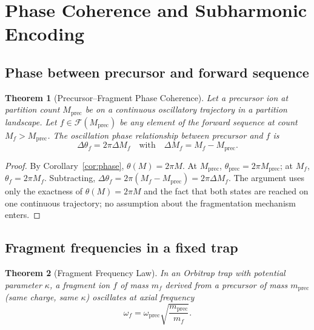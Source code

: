 \documentclass[twocolumn,10pt,a4paper]{article}
\theoremstyle{thmstyle}
\newtheorem{theorem}{Theorem}[section]
\theoremstyle{definition}
\theoremstyle{remark}
\newcommand{\calF}{\mathcal{F}}
\begin{document}
\section{Phase Coherence and Subharmonic Encoding}
\label{sec:phase}

\subsection{Phase between precursor and forward sequence}

\begin{theorem}[Precursor--Fragment Phase Coherence]
\label{thm:coh}
Let a precursor ion at partition count $M_{\mathrm{prec}}$ be on a
continuous oscillatory trajectory in a partition landscape. Let
$f\in\calF(M_{\mathrm{prec}})$ be any element of the forward sequence
at count $M_{f}>M_{\mathrm{prec}}$. The oscillation phase
relationship between precursor and $f$ is
\begin{equation}
\boxed{\;\Delta\theta_{f}=2\pi\Delta M_{f}\quad\text{with}\quad
\Delta M_{f}=M_{f}-M_{\mathrm{prec}}.\;}
\label{eq:dtheta}
\end{equation}
\end{theorem}

\begin{proof}
By Corollary~\ref{cor:phase}, $\theta(M)=2\pi M$. At
$M_{\mathrm{prec}}$, $\theta_{\mathrm{prec}}=2\pi M_{\mathrm{prec}}$;
at $M_{f}$, $\theta_{f}=2\pi M_{f}$. Subtracting,
$\Delta\theta_{f}=2\pi(M_{f}-M_{\mathrm{prec}})=2\pi\Delta M_{f}$.
The argument uses only the exactness of $\theta(M)=2\pi M$ and the
fact that both states are reached on one continuous trajectory; no
assumption about the fragmentation mechanism enters.
\end{proof}

\subsection{Fragment frequencies in a fixed trap}

\begin{theorem}[Fragment Frequency Law]
\label{thm:ffreq}
In an Orbitrap trap with potential parameter $\kappa$, a fragment ion
$f$ of mass $m_{f}$ derived from a precursor of mass $m_{\mathrm{prec}}$
(same charge, same $\kappa$) oscillates at axial frequency
\begin{equation}
\omega_{f}=\omega_{\mathrm{prec}}\sqrt{\frac{m_{\mathrm{prec}}}{m_{f}}}.
\label{eq:ffreq}
\end{equation}
\end{theorem}
\end{document}
